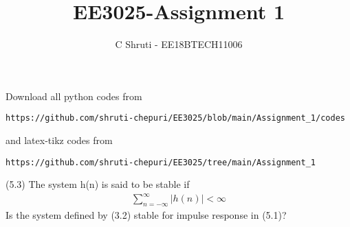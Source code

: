 \documentclass[journal,12pt,twocolumn]{IEEEtran}
\begin{document}
     \def\rightbox#1{\makebox[0in][r]{#1}}
     \def\centbox#1{\makebox[0in]{#1}}
     \def\topbox#1{\raisebox{-\baselineskip}[0in][0in]{#1}}
     \def\midbox#1{\raisebox{-0.5\baselineskip}[0in][0in]{#1}}
\vspace{3cm}
\title{EE3025-Assignment 1}
\author{C Shruti - EE18BTECH11006}
\maketitle
\newpage
\bigskip
\renewcommand{\thefigure}{\theenumi}
\renewcommand{\thetable}{\theenumi}
Download all python codes from 
\begin{lstlisting}
https://github.com/shruti-chepuri/EE3025/blob/main/Assignment_1/codes
\end{lstlisting}
%
and latex-tikz codes from 
%
\begin{lstlisting}
https://github.com/shruti-chepuri/EE3025/tree/main/Assignment_1
\end{lstlisting}
(5.3) The system h(n) is said to be stable if 
\begin{align}
\sum_{n=-\infty}^{\infty}{|h(n)|} < \infty
\end{align}
Is the system defined by (3.2) stable for impulse response in (5.1)?
\end{document}
